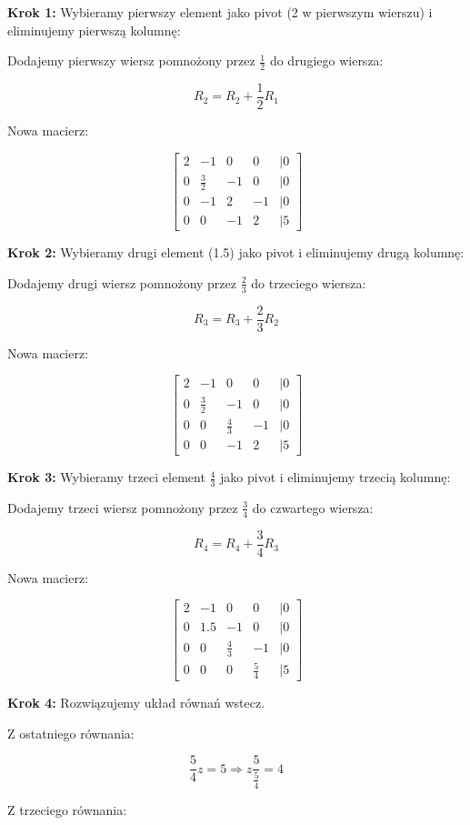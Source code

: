 \documentclass{article}
\begin{document}
\textbf{Krok 1:} Wybieramy pierwszy element jako pivot (2 w pierwszym wierszu) i eliminujemy pierwszą kolumnę:

Dodajemy pierwszy wiersz pomnożony przez \( \frac{1}{2} \) do drugiego wiersza:

\[
R_2 = R_2 + \frac{1}{2} R_1
\]

Nowa macierz:

\[
\begin{bmatrix}
2 & -1 & 0 & 0 & | 0 \\
0 & \frac{3}{2} & -1 & 0 & | 0 \\
0 & -1 & 2 & -1 & | 0 \\
0 & 0 & -1 & 2 & | 5
\end{bmatrix}
\]

\textbf{Krok 2:} Wybieramy drugi element (1.5) jako pivot i eliminujemy drugą kolumnę:

Dodajemy drugi wiersz pomnożony przez \( \frac{2}{3} \) do trzeciego wiersza:

\[
R_3 = R_3 + \frac{2}{3} R_2
\]

Nowa macierz:

\[
\begin{bmatrix}
2 & -1 & 0 & 0 & | 0 \\
0 & \frac{3}{2} & -1 & 0 & | 0 \\
0 & 0 & \frac{4}{3} & -1 & | 0 \\
0 & 0 & -1 & 2 & | 5
\end{bmatrix}
\]

\textbf{Krok 3:} Wybieramy trzeci element \( \frac{4}{3} \) jako pivot i eliminujemy trzecią kolumnę:

Dodajemy trzeci wiersz pomnożony przez \( \frac{3}{4} \) do czwartego wiersza:

\[
R_4 = R_4 + \frac{3}{4} R_3
\]

Nowa macierz:

\[
\begin{bmatrix}
2 & -1 & 0 & 0 & | 0 \\
0 & 1.5 & -1 & 0 & | 0 \\
0 & 0 & \frac{4}{3} & -1 & | 0 \\
0 & 0 & 0 & \frac{5}{4} & | 5
\end{bmatrix}
\]

\textbf{Krok 4:} Rozwiązujemy układ równań wstecz.

Z ostatniego równania:

\[
\frac{5}{4}z = 5 \Rightarrow z\frac{5}{\frac{5}{4}} = 4
\]

Z trzeciego równania:
\end{document}
